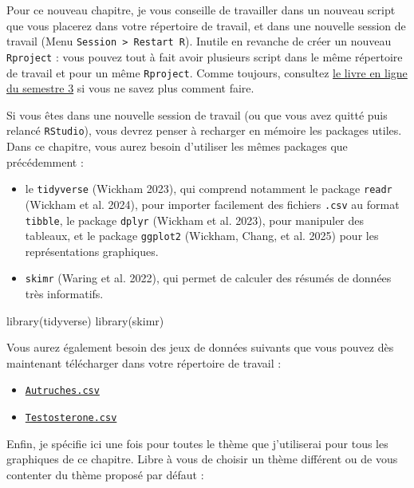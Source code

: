 \documentclass[
  french,
  a4paper,
  DIV=11,
  numbers=noendperiod,
  oneside]{scrreprt}
\newenvironment{Shaded}{}{}
\newcommand{\FunctionTok}[1]{\textcolor[rgb]{0.44,0.26,0.76}{#1}}
\newcommand{\NormalTok}[1]{\textcolor[rgb]{0.14,0.16,0.18}{#1}}
\providecommand{\tightlist}{%
  \setlength{\itemsep}{0pt}\setlength{\parskip}{0pt}}
\begin{document}
Pour ce nouveau chapitre, je vous conseille de travailler dans un
nouveau script que vous placerez dans votre répertoire de travail, et
dans une nouvelle session de travail (Menu
\texttt{Session\ \textgreater{}\ Restart\ R}). Inutile en revanche de
créer un nouveau \texttt{Rproject} : vous pouvez tout à fait avoir
plusieurs script dans le même répertoire de travail et pour un même
\texttt{Rproject}. Comme toujours, consultez
\href{https://besibo.github.io/BiometrieS3/01-R-basics.html\#sec-code}{le
livre en ligne du semestre 3} si vous ne savez plus comment faire.

Si vous êtes dans une nouvelle session de travail (ou que vous avez
quitté puis relancé \texttt{RStudio}), vous devrez penser à recharger en
mémoire les packages utiles. Dans ce chapitre, vous aurez besoin
d'utiliser les mêmes packages que précédemment :

\begin{itemize}
\tightlist
\item
  le \texttt{tidyverse} (Wickham 2023), qui comprend notamment le
  package \texttt{readr} (Wickham et al. 2024), pour importer facilement
  des fichiers \texttt{.csv} au format \texttt{tibble}, le package
  \texttt{dplyr} (Wickham et al. 2023), pour manipuler des tableaux, et
  le package \texttt{ggplot2} ({Wickham, Chang, et al.} 2025) pour les
  représentations graphiques.
\item
  \texttt{skimr} (Waring et al. 2022), qui permet de calculer des
  résumés de données très informatifs.
\end{itemize}

\begin{Shaded}
\begin{Highlighting}[]
\FunctionTok{library}\NormalTok{(tidyverse)}
\FunctionTok{library}\NormalTok{(skimr)}
\end{Highlighting}
\end{Shaded}

Vous aurez également besoin des jeux de données suivants que vous pouvez
dès maintenant télécharger dans votre répertoire de travail :

\begin{itemize}
\tightlist
\item
  \href{data/Autruches.csv}{\texttt{Autruches.csv}}
\item
  \href{data/Testosterone.csv}{\texttt{Testosterone.csv}}
\end{itemize}

Enfin, je spécifie ici une fois pour toutes le thème que j'utiliserai
pour tous les graphiques de ce chapitre. Libre à vous de choisir un
thème différent ou de vous contenter du thème proposé par défaut :
\end{document}
